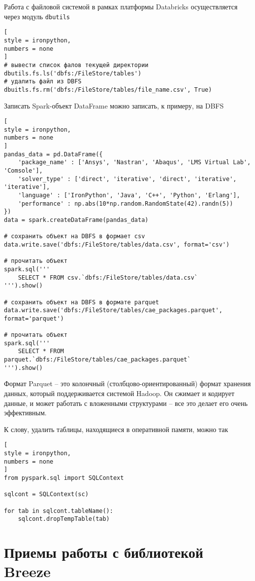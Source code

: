 \documentclass[%
	11pt,
	a4paper,
	utf8,
		]{article}
\begin{document}
Работа с файловой системой в рамках платформы Databricks осуществляется через модуль \texttt{dbutils}
\begin{lstlisting}[
style = ironpython,
numbers = none
]
# вывести список фалов текущей директории
dbutils.fs.ls('dbfs:/FileStore/tables')
# удалить файл из DBFS
dbuitls.fs.rm('dbfs:/FileStore/tables/file_name.csv', True)
\end{lstlisting} 

Записать Spark-объект DataFrame можно записать, к примеру, на DBFS
\begin{lstlisting}[
style = ironpython,
numbers = none
]
pandas_data = pd.DataFrame({
    'package_name' : ['Ansys', 'Nastran', 'Abaqus', 'LMS Virtual Lab', 'Comsole'],
    'solver_type' : ['direct', 'iterative', 'direct', 'iterative', 'iterative'],
    'language' : ['IronPython', 'Java', 'C++', 'Python', 'Erlang'],
    'performance' : np.abs(10*np.random.RandomState(42).randn(5))
})
data = spark.createDataFrame(pandas_data)

# сохранить объект на DBFS в формает csv
data.write.save('dbfs:/FileStore/tables/data.csv', format='csv')

# прочитать объект
spark.sql('''
    SELECT * FROM csv.`dbfs:/FileStore/tables/data.csv`
''').show()

# сохранить объект на DBFS в формате parquet
data.write.save('dbfs:/FileStore/tables/cae_packages.parquet', format='parquet')

# прочитать объект
spark.sql('''
    SELECT * FROM parquet.`dbfs:/FileStore/tables/cae_packages.parquet`
''').show()
\end{lstlisting}

Формат Parquet -- это колончный (столбцово-ориентированный) формат хранения данных, который поддерживается системой Hadoop. Он сжимает и кодирует данные, и может работать с вложенными структурами -- все это делает его очень эффективным.

К слову, удалить таблицы, находящиеся в оперативной памяти, можно так
\begin{lstlisting}[
style = ironpython,
numbers = none
]
from pyspark.sql import SQLContext

sqlcont = SQLContext(sc)

for tab in sqlcont.tableName():
    sqlcont.dropTempTable(tab)
\end{lstlisting}

\section{Приемы работы с библиотекой Breeze}
\end{document}
